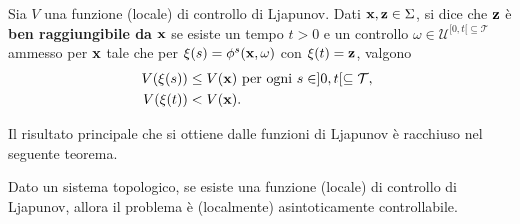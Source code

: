 \begin{definition}
    Sia $V$ una funzione (locale) di controllo di Ljapunov.
    Dati $\mathbf{x}, \mathbf{z} \in \Sigma$, si dice che $\mathbf{z}$ è \textbf{ben raggiungibile
    da} $\mathbf{x}$ se esiste un tempo $t > 0$ e un controllo $\omega \in \mathcal U^{[0,t[ \subseteq \mathcal T}$ ammesso per $\mathbf{x}$
    tale che per $\xi(s) = \phi^s(\mathbf{x}, \omega)$ con $\xi(t) = \mathbf{z}$, valgono
    \begin{align*}
        V(\xi(s)) &\leq V(\mathbf{x}) \text{ per ogni } s \in ]0,t[ \subseteq \mathcal T,~\\
        V(\xi(t)) &< V(\mathbf{x}).
    \end{align*}
    \label{def:ben-raggiungibile}
\end{definition}

Il risultato principale che si ottiene dalle funzioni di Ljapunov è racchiuso nel seguente teorema.
\begin{thm}
    Dato un sistema topologico, se esiste una funzione (locale) di controllo di Ljapunov,
    allora il problema è (localmente) asintoticamente controllabile.
    \label{thm:ljapunov}
\end{thm}

